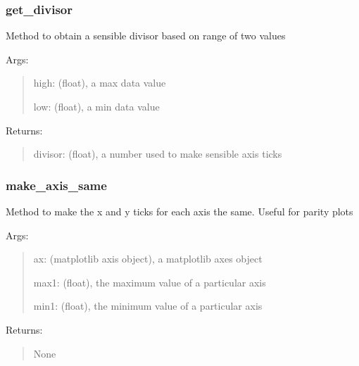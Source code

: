 \documentclass[letterpaper,10pt,english]{sphinxmanual}
\begin{document}
\subsubsection{get\_divisor}
\label{\detokenize{api/mastml.plots.get_divisor:get-divisor}}\label{\detokenize{api/mastml.plots.get_divisor::doc}}

\begin{fulllineitems}
\label{\detokenize{api/mastml.plots.get_divisor:mastml.plots.get_divisor}}
Method to obtain a sensible divisor based on range of two values

Args:
\begin{quote}

high: (float), a max data value

low: (float), a min data value
\end{quote}

Returns:
\begin{quote}

divisor: (float), a number used to make sensible axis ticks
\end{quote}

\end{fulllineitems}



\subsubsection{make\_axis\_same}
\label{\detokenize{api/mastml.plots.make_axis_same:make-axis-same}}\label{\detokenize{api/mastml.plots.make_axis_same::doc}}

\begin{fulllineitems}
\label{\detokenize{api/mastml.plots.make_axis_same:mastml.plots.make_axis_same}}
Method to make the x and y ticks for each axis the same. Useful for parity plots

Args:
\begin{quote}

ax: (matplotlib axis object), a matplotlib axes object

max1: (float), the maximum value of a particular axis

min1: (float), the minimum value of a particular axis
\end{quote}

Returns:
\begin{quote}

None
\end{quote}

\end{fulllineitems}
\end{document}
